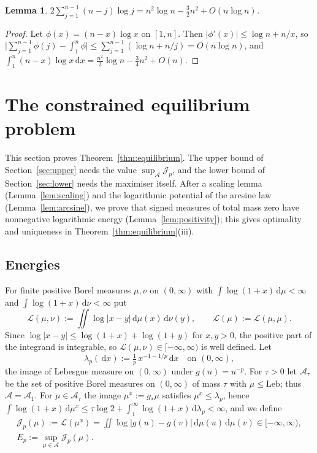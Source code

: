 \documentclass{amsart}
\newtheorem{lemma}[theorem]{Lemma}
\theoremstyle{definition}
\theoremstyle{remark}
\numberwithin{equation}{section}
\newcommand{\cA}{\mathcal{A}}
\newcommand{\cJ}{\mathcal{J}}
\newcommand{\cL}{\mathcal{L}}
\newcommand{\dd}{\,\mathrm{d}}
\newcommand{\Leb}{\mathrm{Leb}}
\begin{document}
\begin{lemma}\label{lem:sumlog}
$2\sum_{j=1}^{n-1}(n-j)\log j=n^2\log n-\frac32n^2+O(n\log n)$.
\end{lemma}

\begin{proof}
Let $\phi(x)=(n-x)\log x$ on $[1,n]$. Then $|\phi'(x)|\le\log n+n/x$, so
$\bigl|\sum_{j=1}^{n-1}\phi(j)-\int_1^n\phi\bigr|\le\sum_{j=1}^{n-1}(\log n+n/j)=O(n\log n)$, and
$\int_1^n(n-x)\log x\dd x=\frac{n^2}{2}\log n-\frac34n^2+O(n)$.
\end{proof}

\section{The constrained equilibrium problem}\label{sec:equilibrium}

This section proves Theorem~\ref{thm:equilibrium}. The upper bound of Section~\ref{sec:upper} needs the value
$\sup_\cA\cJ_p$, and the lower bound of Section~\ref{sec:lower} needs the maximiser itself. After a scaling lemma
(Lemma~\ref{lem:scaling}) and the logarithmic potential of the arcsine law (Lemma~\ref{lem:arcsine}), we prove that
signed measures of total mass zero have nonnegative logarithmic energy (Lemma~\ref{lem:positivity}); this gives
optimality and uniqueness in Theorem~\ref{thm:equilibrium}(iii).

\subsection{Energies}\label{sec:energies}
For finite positive Borel measures $\mu,\nu$ on $(0,\infty)$ with $\int\log(1+x)\dd\mu<\infty$ and
$\int\log(1+x)\dd\nu<\infty$ put
\[
  \cL(\mu,\nu):=\iint\log|x-y|\dd\mu(x)\dd\nu(y),\qquad\cL(\mu):=\cL(\mu,\mu).
\]
Since $\log|x-y|\le\log(1+x)+\log(1+y)$ for $x,y>0$, the positive part of the integrand is integrable, so
$\cL(\mu,\nu)\in[-\infty,\infty)$ is well defined. Let
\[
  \lambda_p(\dd x):=\tfrac1p\,x^{-1-1/p}\dd x\quad\text{on }(0,\infty),
\]
the image of Lebesgue measure on $(0,\infty)$ under $g(u)=u^{-p}$. For $\tau>0$ let $\cA_\tau$ be the set of positive
Borel measures on $(0,\infty)$ of mass $\tau$ with $\mu\le\Leb$; thus $\cA=\cA_1$. For $\mu\in\cA_\tau$ the image
$\mu^x:=g_*\mu$ satisfies $\mu^x\le\lambda_p$, hence $\int\log(1+x)\dd\mu^x\le\tau\log2+\int_1^\infty\log(1+x)\dd
\lambda_p<\infty$, and we define
\begin{gather*}
  \cJ_p(\mu):=\cL(\mu^x)=\iint\log|g(u)-g(v)|\dd\mu(u)\dd\mu(v)\in[-\infty,\infty),\\
  E_p:=\sup_{\mu\in\cA}\cJ_p(\mu).
\end{gather*}
\end{document}
